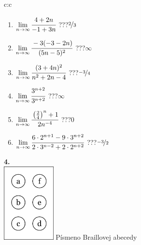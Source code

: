 \documentclass[10pt]{report}
\begin{document}
\begin{tabular}{c:c}
\begin{minipage}[c][104.5mm][t]{0.5\linewidth}
\begin{center}
\begin{minipage}{0.79\linewidth}
\begin{center}
\begin{varwidth}{\linewidth}
\begin{enumerate}
\normalsize
\item $\lim\limits_{n\to\infty}\cfrac{4+2n}{-1+3n}$\quad \dotfill\; ???\;\dotfill \quad $\nicefrac{2}{3}$
\item $\lim\limits_{n\to\infty}\cfrac{-3(-3-2n)}{(5n-5)^2}$\quad \dotfill\; ???\;\dotfill \quad $\infty$
\item $\lim\limits_{n\to\infty}\cfrac{(3+4n)^2}{n^2+2n-4}$\quad \dotfill\; ???\;\dotfill \quad $\nicefrac{-3}{4}$
\item $\lim\limits_{n\to\infty}\cfrac{3^{n+2}}{3^{n+2}}$\quad \dotfill\; ???\;\dotfill \quad $\infty$
\item $\lim\limits_{n\to\infty}\cfrac{\left(\frac{2}{4}\right)^n +1}{2n^{-4}}$\quad \dotfill\; ???\;\dotfill \quad $0$
\item $\lim\limits_{n\to\infty}\cfrac{6\cdot 2^{n+1}-9\cdot 3^{n+2}}{2\cdot 3^{n-2}+2\cdot 2^{n+2}}$\quad \dotfill\; ???\;\dotfill \quad $\nicefrac{-3}{2}$
\end{enumerate}
\end{varwidth}
\end{center}
\end{minipage}
\begin{minipage}{0.20\linewidth}
\begin{center}
{\Huge\bfseries 4.} \\[2mm]
\includegraphics[height=40mm]{../images/braille.png}
{\small Písmeno Braillovej abecedy}
\end{center}
\end{minipage}
\end{center}
\end{minipage}
%
\end{tabular}
\newpage
\thispagestyle{empty}
\end{document}
